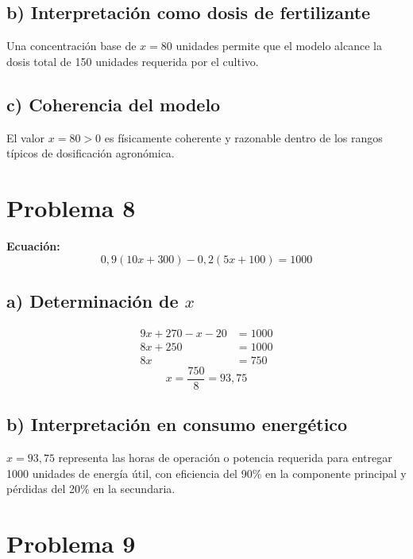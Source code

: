 \documentclass[12pt]{article}
\begin{document}
	\subsection*{b) Interpretación como dosis de fertilizante}
	
	Una concentración base de $x = 80$ unidades permite que el modelo alcance
	la dosis total de 150 unidades requerida por el cultivo.
	
	\subsection*{c) Coherencia del modelo}
	
	El valor $x = 80 > 0$ es físicamente coherente y razonable dentro de los
	rangos típicos de dosificación agronómica.
	
	\bigskip
	
	\section*{Problema 8}
	
	\textbf{Ecuación:}
	\[
	0{,}9(10x + 300) - 0{,}2(5x + 100) = 1000
	\]
	
	\subsection*{a) Determinación de $x$}
	
	\begin{align*}
		9x + 270 - x - 20 &= 1000 \\
		8x + 250          &= 1000 \\
		8x                &= 750
	\end{align*}
	\[
	\boxed{x = \frac{750}{8} = 93{,}75}
	\]
	
	\subsection*{b) Interpretación en consumo energético}
	
	$x = 93{,}75$ representa las horas de operación o potencia requerida para
	entregar 1000 unidades de energía útil, con eficiencia del 90\% en la
	componente principal y pérdidas del 20\% en la secundaria.
	
	\bigskip
	
	\section*{Problema 9}
	
\end{document}
